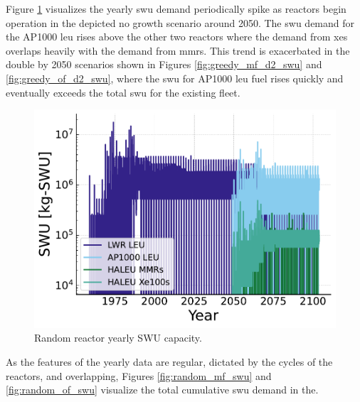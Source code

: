 Figure \ref{fig:swu_yearly_random} visualizes the yearly \gls{swu} demand periodically spike as reactors begin operation in the depicted no growth scenario around 2050. The \gls{swu} demand for the AP1000 \gls{leu} rises above the other two reactors where the demand from \glspl{xe} overlaps heavily with the demand from \glspl{mmr}. This trend is exacerbated in the double by 2050 scenarios shown in Figures \ref{fig:greedy_mf_d2_swu} and \ref{fig:greedy_of_d2_swu}, where the \gls{swu} for AP1000 \gls{leu} fuel rises quickly and eventually exceeds the total \gls{swu} for the existing fleet.



\begin{figure}[H]
    \centering
    \includegraphics[scale=0.7]{images/results/swu/multi_drng_swu_by_fuel.pdf}
    \caption{Random reactor yearly SWU capacity.}
    \label{fig:swu_yearly_random}
\end{figure}

As the features of the yearly data are regular, dictated by the cycles of the
reactors, and overlapping, Figures \ref{fig:random_mf_swu} and \ref{fig:random_of_swu} visualize the total cumulative \gls{swu} demand in the.


